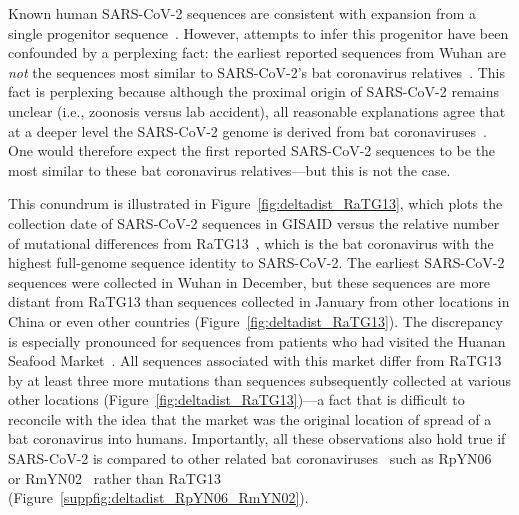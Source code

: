\documentclass[9pt,twocolumn,twoside]{gsajnl_modified}
\begin{document}
Known human SARS-CoV-2 sequences are consistent with expansion from a single progenitor sequence~\citep{kumar2021evolutionary,pekar2021timing,rambaut2020dynamic,forster2020phylogenetic,pipes2021assessing}.
However, attempts to infer this progenitor have been confounded by a perplexing fact: the earliest reported sequences from Wuhan are \emph{not} the sequences most similar to SARS-CoV-2's bat coronavirus relatives~\citep{pipes2021assessing}.
This fact is perplexing because although the proximal origin of SARS-CoV-2 remains unclear (i.e., zoonosis versus lab accident), all reasonable explanations agree that at a deeper level the SARS-CoV-2 genome is derived from bat coronaviruses~\citep{lytras2021exploring}.
One would therefore expect the first reported SARS-CoV-2 sequences to be the most similar to these bat coronavirus relatives---but this is not the case.

This conundrum is illustrated in Figure~\ref{fig:deltadist_RaTG13}, which plots the collection date of SARS-CoV-2 sequences in GISAID versus the relative number of mutational differences from RaTG13~\citep{zhou2020pneumonia}, which is the bat coronavirus with the highest full-genome sequence identity to SARS-CoV-2.
The earliest SARS-CoV-2 sequences were collected in Wuhan in December, but these sequences are more distant from RaTG13 than sequences collected in January from other locations in China or even other countries (Figure~\ref{fig:deltadist_RaTG13}).
The discrepancy is especially pronounced for sequences from patients who had visited the Huanan Seafood Market~\citep{WHO2021origins}.
All sequences associated with this market differ from RaTG13 by at least three more mutations than sequences subsequently collected at various other locations (Figure~\ref{fig:deltadist_RaTG13})---a fact that is difficult to reconcile with the idea that the market was the original location of spread of a bat coronavirus into humans.
Importantly, all these observations also hold true if SARS-CoV-2 is compared to other related bat coronaviruses~\citep{lytras2021exploring} such as RpYN06~\citep{zhou2021identification} or RmYN02~\citep{zhou2020novel} rather than RaTG13 (Figure~\ref{suppfig:deltadist_RpYN06_RmYN02}).
\end{document}
